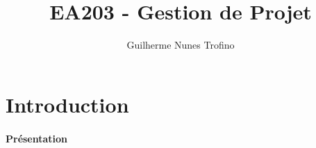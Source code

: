 \documentclass{article}
\title{EA203 - Gestion de Projet}
\author{Guilherme Nunes Trofino}
\begin{document}
\maketitle

\newpage\tableofcontents
\section{Introduction}
\paragraph{Présentation}
\end{document}
